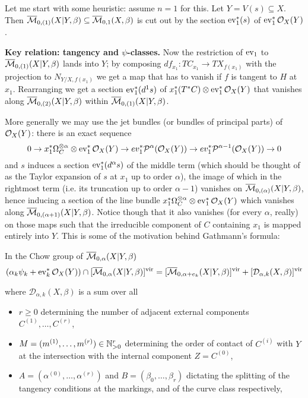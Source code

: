 Let me start with some heuristic: assume $n=1$ for this. Let $Y=V(s)\subseteq X$. Then $\overline{\mathcal{M}}_{0,(1)}(X|Y,\beta)\subseteq \overline{\mathcal{M}}_{0,1}(X,\beta)$ is cut out by the section $\operatorname{ev}_1^*(s)$ of $\operatorname{ev}_1^*\mathcal{O}_X(Y)$.

\textbf{Key relation: tangency and $\psi$-classes.} Now the restriction of $\operatorname{ev}_1$ to $\overline{\mathcal{M}}_{0,(1)}(X|Y,\beta)$ lands into $Y$; by composing $df_{x_1}\colon TC_{x_1}\to TX_{f(x_1)}$ with the projection to $N_{Y/X,f(x_1)}$ we get a map that has to vanish if $f$ is tangent to $H$ at $x_1$. Rearranging we get a section $\operatorname{ev}_1^*(d^1s)$ of $x_1^*(T^*C)\otimes\operatorname{ev}_1^*\mathcal{O}_X(Y)$ that vanishes along $\overline{\mathcal{M}}_{0,(2)}(X|Y,\beta)$ within $\overline{\mathcal{M}}_{0,(1)}(X|Y,\beta)$.

More generally we may use the jet bundles (or bundles of principal parts) of $\mathcal{O}_X(Y)$: there is an exact sequence
\[ 0\rightarrow x_1^*\Omega_{C}^{\otimes \alpha}\otimes\operatorname{ev}_1^*\mathcal{O}_X(Y)\rightarrow ev_1^*\mathcal P^{\alpha}(\mathcal{O}_X(Y))\rightarrow ev_1^*\mathcal P^{\alpha-1}(\mathcal{O}_X(Y))\rightarrow 0\]
and $s$ induces a section $\operatorname{ev}_1^*(d^{\alpha}s)$ of the middle term (which should be thought of as the Taylor expansion of $s$ at $x_1$ up to order $\alpha$), the image of which in the rightmost term (i.e. its truncation up to order $\alpha-1$) vanishes on $\overline{\mathcal{M}}_{0,(\alpha)}(X|Y,\beta)$, hence inducing a section of the line bundle $x_1^*\Omega_{C}^{\otimes \alpha}\otimes\operatorname{ev}_1^*\mathcal{O}_X(Y)$ which vanishes along $\overline{\mathcal{M}}_{0,(\alpha+1)}(X|Y,\beta)$. Notice though that it also vanishes (for every $\alpha$, really) on those maps such that the irreducible component of $C$ containing $x_1$ is mapped entirely into $Y$. This is some of the motivation behind Gathmann's formula:
\begin{thm}\cite[Theorem 2.6]{Ga}\label{thm:Gathmann_formula} In the Chow group of $\overline{\mathcal{M}}_{0,\alpha}(X|Y,\beta)$
 \begin{equation*} (\alpha_k \psi_k + \operatorname{ev}_k^* \mathcal{O}_X(Y)) \cap [\overline{\mathcal{M}}_{0,\alpha}(X|Y,\beta)]^{\mathrm{vir}} = [\overline{\mathcal{M}}_{0,\alpha+e_k}(X|Y,\beta)]^{\mathrm{vir}} + [\mathcal{D}_{\alpha,k}(X,\beta)]^{\mathrm{vir}} \end{equation*}
\end{thm}
where $\mathcal{D}_{\alpha,k}(X,\beta)$ is a sum over all
\begin{itemize}
 \item $r\geq 0$ determining the number of adjacent external components $C^{(1)},\ldots,C^{(r)}$,
 \item $M=(m^{(1)},\ldots,m^{(r)})\in \mathbb{N}^r_{>0}$ determining the order of contact of $C^{(i)}$ with $Y$ at the intersection with the internal component $Z=C^{(0)}$,
 \item $A=(\alpha^{(0)},\ldots,\alpha^{(r)})$ and $B=(\beta_0,\ldots,\beta_r)$ dictating the splitting of the tangency conditions at the markings, and of the curve class respectively,
\end{itemize}
